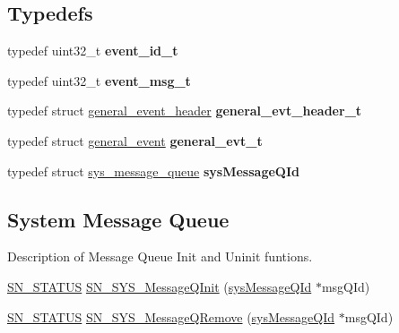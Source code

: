 \subsection*{Typedefs}
\begin{DoxyCompactItemize}
\item 
\mbox{\label{group__SYSTEM__MESSAGE__Q_gad24a094c35ed8ae444f4b7c6ea51704d}} 
typedef uint32\+\_\+t {\bfseries event\+\_\+id\+\_\+t}
\item 
\mbox{\label{group__SYSTEM__MESSAGE__Q_ga655cadf65449a0b80f198cb7ce166d41}} 
typedef uint32\+\_\+t {\bfseries event\+\_\+msg\+\_\+t}
\item 
\mbox{\label{group__SYSTEM__MESSAGE__Q_ga12432b205deff971be5518bc28b39dd4}} 
typedef struct \hyperlink{structgeneral__event__header}{general\+\_\+event\+\_\+header} {\bfseries general\+\_\+evt\+\_\+header\+\_\+t}
\item 
\mbox{\label{group__SYSTEM__MESSAGE__Q_gaf304949d0591c2493574a1acc0eb0546}} 
typedef struct \hyperlink{structgeneral__event}{general\+\_\+event} {\bfseries general\+\_\+evt\+\_\+t}
\item 
\mbox{\label{group__SYSTEM__MESSAGE__Q_ga4d5c8f4d684de3a1e6e73e63f9f25c98}} 
typedef struct \hyperlink{structsys__message__queue}{sys\+\_\+message\+\_\+queue} {\bfseries sys\+Message\+Q\+Id}
\end{DoxyCompactItemize}
\subsection*{System Message Queue}
\label{_amgrp48df3e1e25fae78bccb5f7c7f06f8b36}%
Description of Message Queue Init and Uninit funtions. \begin{DoxyCompactItemize}
\item 
\hyperlink{group__SYSTEM__ERROR_ga4540713b9a7a18ce44d78c3a10f7442f}{S\+N\+\_\+\+S\+T\+A\+T\+US} \hyperlink{group__SYSTEM__MESSAGE__Q_ga35e9ff084626dfccd36d098827638a0c}{S\+N\+\_\+\+S\+Y\+S\+\_\+\+Message\+Q\+Init} (\hyperlink{structsys__message__queue}{sys\+Message\+Q\+Id} $\ast$msg\+Q\+Id)
\item 
\hyperlink{group__SYSTEM__ERROR_ga4540713b9a7a18ce44d78c3a10f7442f}{S\+N\+\_\+\+S\+T\+A\+T\+US} \hyperlink{group__SYSTEM__MESSAGE__Q_ga293a77ea597b70f3f2f38b919f93497e}{S\+N\+\_\+\+S\+Y\+S\+\_\+\+Message\+Q\+Remove} (\hyperlink{structsys__message__queue}{sys\+Message\+Q\+Id} $\ast$msg\+Q\+Id)
\end{DoxyCompactItemize}
